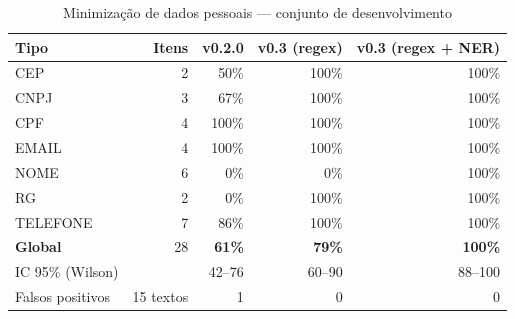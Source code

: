 \begin{table}[htbp]
\caption{Minimização de dados pessoais --- conjunto de desenvolvimento}\label{tab:minimizacao_desen}
\centering\small
\setlength{\tabcolsep}{4pt}
\begin{tabular}{lrrrr}
\toprule
Tipo & Itens & v0.2.0 & v0.3 (regex) & v0.3 (regex + NER) \\
\midrule
CEP & 2 & 50\% & 100\% & 100\% \\
CNPJ & 3 & 67\% & 100\% & 100\% \\
CPF & 4 & 100\% & 100\% & 100\% \\
EMAIL & 4 & 100\% & 100\% & 100\% \\
NOME & 6 & 0\% & 0\% & 100\% \\
RG & 2 & 0\% & 100\% & 100\% \\
TELEFONE & 7 & 86\% & 100\% & 100\% \\
\textbf{Global} & 28 & \textbf{61\%} & \textbf{79\%} & \textbf{100\%} \\
IC 95\% (Wilson) &  & 42--76 & 60--90 & 88--100 \\
Falsos positivos & 15 textos & 1 & 0 & 0 \\
\bottomrule
\end{tabular}
\end{table}
